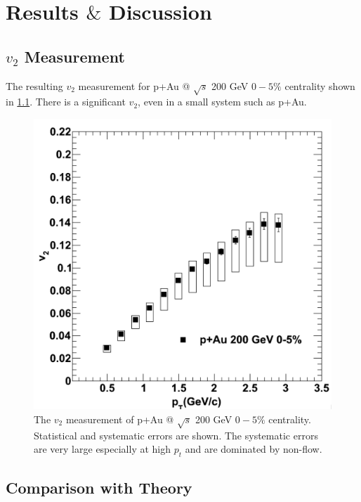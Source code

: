 \chapter{Results $\&$ Discussion}
\section{$v_2$ Measurement}
The resulting $v_2$ measurement for p+Au @ $\sqrt{s}$ 200 GeV $0-5\%$ centrality shown in \ref{fig:pau_points_alone}. There is a significant $v_2$, even in a small system such as p+Au.

\begin{figure}
\begin{center}
\includegraphics[width=0.75\linewidth]{figs/pau_points.png}
\caption{The $v_2$ measurement of p+Au @ $\sqrt{s}$ 200 GeV $0-5\%$ centrality. Statistical and systematic errors are shown. The systematic errors are very large especially at high $p_t$ and are dominated by non-flow.}
\label{fig:pau_points_alone}
\end{center}
\end{figure}

\section{Comparison with Theory}

